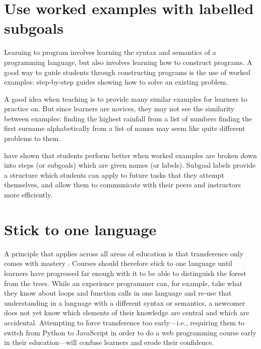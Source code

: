 \documentclass{article}
\begin{document}
\section{Use worked examples with labelled subgoals}\label{worked-examples}

Learning to program involves learning the syntax and semantics of a programming language,
but also involves learning how to construct programs.
A good way to guide students through constructing programs is the use of worked examples:
step-by-step guides showing how to solve an existing problem.

A good idea when teaching is
to provide many similar examples for learners to practice on.
But since learners are novices,
they may not see the similarity between examples:
finding the highest rainfall from a list of numbers
finding the first surname alphabetically from a list of names
may seem like quite different problems to them.

\citet{morrison-subgoals,morrison-parsons} have shown that students perform better
when worked examples are broken down into steps (or subgoals)
which are given names (or labels).
Subgoal labels provide a structure which students can apply to future tasks that they attempt themselves,
and allow them to communicate with their peers and instructors more efficiently.


\section{Stick to one language}\label{one-language}

A principle that applies across all areas of education is that transference only comes with mastery \cite{gick-holyoak}.
Courses should therefore stick to one language until learners have progressed far enough with it
to be able to distinguish the forest from the trees.
While an experience programmer can,
for example,
take what they know about loops and function calls in one language
and re-use that understanding in a language with a different syntax or semantics,
a newcomer does not yet know which elements of their knowledge are central
and which are accidental.
Attempting to force transference too early---i.e.,
requiring them to switch from Python to JavaScript in order to do a web programming course
early in their education---will confuse learners and erode their confidence.
\end{document}
